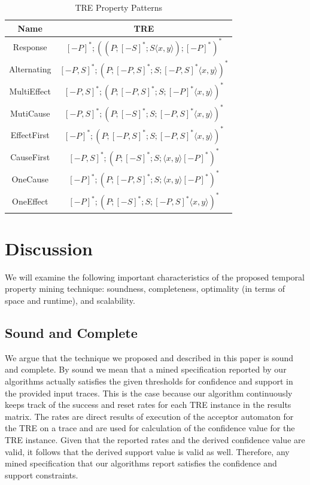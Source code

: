 \documentclass[]{sigplanconf}
\begin{document}
\begin{table}[ht]
  \centering
  \begin{tabular}{|c|c|}
  \hline
  \textbf{Name} & \textbf{TRE}  \\ \hline
  Response      & $[-P]^*;((P;[-S]^*;S \langle x,y \rangle);[-P]^*)^*$        \\ \hline
  Alternating   & $[-P,S]^*;(P;[-P,S]^*;S;[-P,S]^* \langle x,y \rangle)^*$       \\ \hline
  MultiEffect   &  $[-P,S]^*;(P;[-P,S]^*;S;[-P]^* \langle x,y \rangle)^*$     \\ \hline
  MutiCause     &  $[-P,S]^*;(P;[-S]^*;S;[-P,S]^* \langle x,y \rangle)^*$     \\ \hline
  EffectFirst   &  $[-P]^*;(P;[-P,S]^*;S;[-P,S]^* \langle x,y \rangle)^*$      \\ \hline
  CauseFirst    &  $[-P,S]^*;(P;[-S]^*;S;\langle x,y \rangle [-P]^*)^*$       \\ \hline
  OneCause      &  $[-P]^*;(P;[-P,S]^*;S;\langle x,y \rangle [-P]^*)^*$       \\ \hline
  OneEffect     &  $[-P]^*;(P;[-S]^*;S;[-P,S]^* \langle x,y \rangle)^*$       \\ \hline
\end{tabular}
\caption{TRE Property Patterns}\label{TRE_Exp}
\end{table}


\section{Discussion} \label{discussion}

We will examine the following important characteristics of the proposed temporal property mining technique: soundness, completeness, optimality (in terms of space and runtime), and scalability.


\subsection{Sound and Complete}

We argue that the technique we proposed and described in this paper is sound and complete. By sound we mean that a mined specification reported by our algorithms actually satisfies the given thresholds for confidence and support in the provided input traces. This is the case because our algorithm continuously keeps track of the success and reset rates for each TRE instance in the results matrix. The rates are direct results of execution of the acceptor automaton for the TRE on a trace and are used for calculation of the confidence value for the TRE instance. Given that the reported rates and the derived confidence value are valid, it follows that the derived support value is valid as well. Therefore, any mined specification that our algorithms report satisfies the confidence and support constraints.
\end{document}
